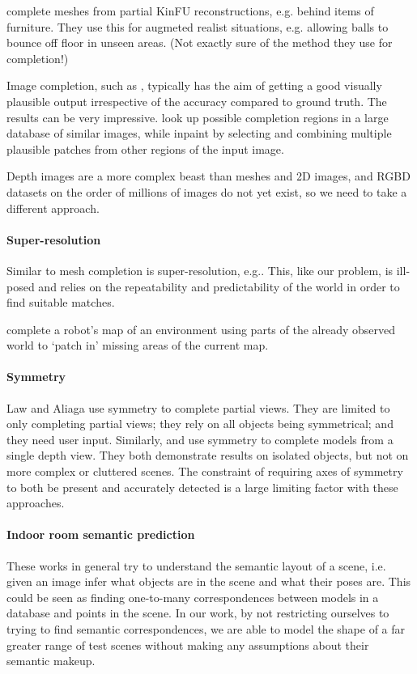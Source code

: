 \documentclass[10pt,a4paper, twocolumn]{article}
\makeatletter
\newcommand*{\eg}{e.g.\@\xspace}
\newcommand*{\ie}{i.e.\@\xspace}
\makeatother
\begin{document}
\cite{silberman-eccv-2014} complete meshes from partial KinFU reconstructions, \eg behind items of furniture.
They use this for augmeted realist situations, \eg allowing balls to bounce off floor in unseen areas.
(Not exactly sure of the method they use for completion!)

Image completion, such as \cite{hays-siggraph-2007, criminisi-cvpr-2003}, typically has the aim of getting a good visually plausible output irrespective of the accuracy compared to ground truth. 
The results can be very impressive. 
\cite{hays-siggraph-2007} look up possible completion regions in a large database of similar images, while \cite{criminisi-cvpr-2003} inpaint by selecting and combining multiple plausible patches from other regions of the input image.

Depth images are a more complex beast than meshes and 2D images, and RGBD datasets on the order of millions of images do not yet exist, so we need to take a different approach.

\paragraph{Super-resolution}
Similar to mesh completion is super-resolution, \eg \cite{macaodha-eccv-2012}. 
This, like our problem, is ill-posed and relies on the repeatability and predictability of the world in order to find suitable matches.

\cite{chang-tor-2007} complete a robot's map of an environment using parts of the already observed world to  `patch in' missing areas of the current map.

\paragraph{Symmetry}
Law and Aliaga \cite{law-cviu-2010} use symmetry to complete partial views. 
They are limited to only completing partial views; they rely on all objects being symmetrical; and they need user input.
Similarly, \cite{thrun-iccv-2005} and \cite{kroemer-humanoids-2012} use symmetry to complete models from a single depth view. 
They both demonstrate results on isolated objects, but not on more complex or cluttered scenes. 
The constraint of requiring axes of symmetry to both be present and accurately detected is a large limiting factor with these approaches.

\paragraph{Indoor room semantic prediction}
These works in general try to understand the semantic layout of a scene, \ie given an image infer what objects are in the scene and what their poses are.
\cite{nan-acm-2012, minkim-siggraphasia-2012}
This could be seen as finding one-to-many correspondences between models in a database and points in the scene.
In our work, by not restricting ourselves to trying to find semantic correspondences, we are able to model the shape of a far greater range of test scenes without making any assumptions about their semantic makeup.
\end{document}
